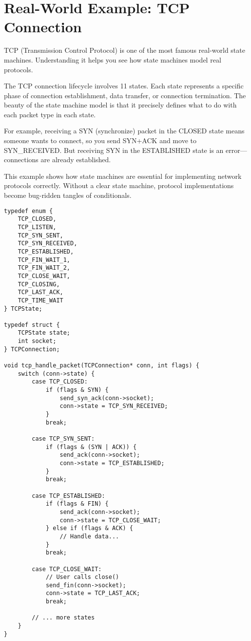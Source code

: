 \section{Real-World Example: TCP Connection}

TCP (Transmission Control Protocol) is one of the most famous real-world state machines. Understanding it helps you see how state machines model real protocols.

The TCP connection lifecycle involves 11 states. Each state represents a specific phase of connection establishment, data transfer, or connection termination. The beauty of the state machine model is that it precisely defines what to do with each packet type in each state.

For example, receiving a SYN (synchronize) packet in the CLOSED state means someone wants to connect, so you send SYN+ACK and move to SYN\_RECEIVED. But receiving SYN in the ESTABLISHED state is an error—connections are already established.

This example shows how state machines are essential for implementing network protocols correctly. Without a clear state machine, protocol implementations become bug-ridden tangles of conditionals.

\begin{lstlisting}
typedef enum {
    TCP_CLOSED,
    TCP_LISTEN,
    TCP_SYN_SENT,
    TCP_SYN_RECEIVED,
    TCP_ESTABLISHED,
    TCP_FIN_WAIT_1,
    TCP_FIN_WAIT_2,
    TCP_CLOSE_WAIT,
    TCP_CLOSING,
    TCP_LAST_ACK,
    TCP_TIME_WAIT
} TCPState;

typedef struct {
    TCPState state;
    int socket;
} TCPConnection;

void tcp_handle_packet(TCPConnection* conn, int flags) {
    switch (conn->state) {
        case TCP_CLOSED:
            if (flags & SYN) {
                send_syn_ack(conn->socket);
                conn->state = TCP_SYN_RECEIVED;
            }
            break;

        case TCP_SYN_SENT:
            if (flags & (SYN | ACK)) {
                send_ack(conn->socket);
                conn->state = TCP_ESTABLISHED;
            }
            break;

        case TCP_ESTABLISHED:
            if (flags & FIN) {
                send_ack(conn->socket);
                conn->state = TCP_CLOSE_WAIT;
            } else if (flags & ACK) {
                // Handle data...
            }
            break;

        case TCP_CLOSE_WAIT:
            // User calls close()
            send_fin(conn->socket);
            conn->state = TCP_LAST_ACK;
            break;

        // ... more states
    }
}
\end{lstlisting}

